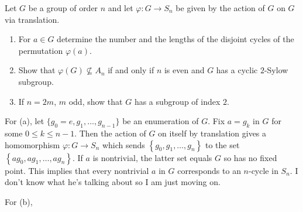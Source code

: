 \begin{problem}
  Let \(G\) be a group of order \(n\) and let \(\varphi\colon G\to S_n\) be
  given by the action of \(G\) on \(G\) via translation.
  \begin{enumerate}[label=(\alph*)]
  \item For \(a\in G\) determine the number and the lengths of the disjoint
    cycles of the permutation \(\varphi(a)\).
  \item Show that \(\varphi(G)\nsubseteq A_n\) if and only if \(n\) is even
    and \(G\) has a cyclic \(2\)-Sylow subgroup.
  \item If \(n=2m\), \(m\) odd, show that \(G\) has a subgroup of index
    \(2\).
  \end{enumerate}
\end{problem}
\begin{solution}
  For (a), let \(\{g_0=e,g_1,\dotsc,g_{n-1}\}\) be an enumeration of
  \(G\). Fix \(a=g_k\) in \(G\) for some \(0\leq k\leq n-1\). Then the
  action of \(G\) on itself by translation gives a homomorphism
  \(\varphi\colon G\to S_n\) which sends
  \(\left\{g_0,g_1,\dotsc,g_n\right\}\) to the set
  \(\left\{ag_0,ag_1,\dotsc,ag_n\right\}\). If \(a\) is nontrivial, the
  latter set equals \(G\) so has no fixed point. This implies that every
  nontrivial \(a\) in \(G\) corresponds to an \(n\)-cycle in \(S_n\). I
  don't know what he's talking about so I am just moving on.

  For (b),
\end{solution}

